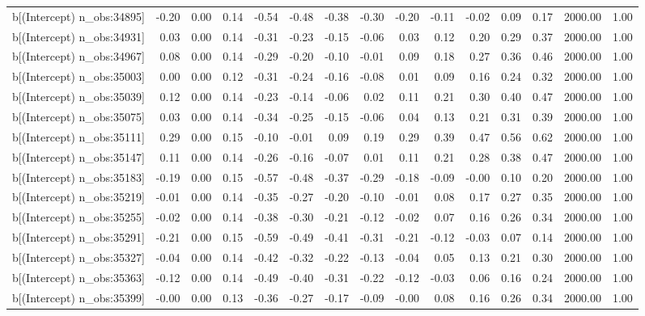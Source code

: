 \begin{table}[ht]
\begin{tabular}{rrrrrrrrrrrrrrr}
  b[(Intercept) n\_obs:34895] & -0.20 & 0.00 & 0.14 & -0.54 & -0.48 & -0.38 & -0.30 & -0.20 & -0.11 & -0.02 & 0.09 & 0.17 & 2000.00 & 1.00 \\ 
  b[(Intercept) n\_obs:34931] & 0.03 & 0.00 & 0.14 & -0.31 & -0.23 & -0.15 & -0.06 & 0.03 & 0.12 & 0.20 & 0.29 & 0.37 & 2000.00 & 1.00 \\ 
  b[(Intercept) n\_obs:34967] & 0.08 & 0.00 & 0.14 & -0.29 & -0.20 & -0.10 & -0.01 & 0.09 & 0.18 & 0.27 & 0.36 & 0.46 & 2000.00 & 1.00 \\ 
  b[(Intercept) n\_obs:35003] & 0.00 & 0.00 & 0.12 & -0.31 & -0.24 & -0.16 & -0.08 & 0.01 & 0.09 & 0.16 & 0.24 & 0.32 & 2000.00 & 1.00 \\ 
  b[(Intercept) n\_obs:35039] & 0.12 & 0.00 & 0.14 & -0.23 & -0.14 & -0.06 & 0.02 & 0.11 & 0.21 & 0.30 & 0.40 & 0.47 & 2000.00 & 1.00 \\ 
  b[(Intercept) n\_obs:35075] & 0.03 & 0.00 & 0.14 & -0.34 & -0.25 & -0.15 & -0.06 & 0.04 & 0.13 & 0.21 & 0.31 & 0.39 & 2000.00 & 1.00 \\ 
  b[(Intercept) n\_obs:35111] & 0.29 & 0.00 & 0.15 & -0.10 & -0.01 & 0.09 & 0.19 & 0.29 & 0.39 & 0.47 & 0.56 & 0.62 & 2000.00 & 1.00 \\ 
  b[(Intercept) n\_obs:35147] & 0.11 & 0.00 & 0.14 & -0.26 & -0.16 & -0.07 & 0.01 & 0.11 & 0.21 & 0.28 & 0.38 & 0.47 & 2000.00 & 1.00 \\ 
  b[(Intercept) n\_obs:35183] & -0.19 & 0.00 & 0.15 & -0.57 & -0.48 & -0.37 & -0.29 & -0.18 & -0.09 & -0.00 & 0.10 & 0.20 & 2000.00 & 1.00 \\ 
  b[(Intercept) n\_obs:35219] & -0.01 & 0.00 & 0.14 & -0.35 & -0.27 & -0.20 & -0.10 & -0.01 & 0.08 & 0.17 & 0.27 & 0.35 & 2000.00 & 1.00 \\ 
  b[(Intercept) n\_obs:35255] & -0.02 & 0.00 & 0.14 & -0.38 & -0.30 & -0.21 & -0.12 & -0.02 & 0.07 & 0.16 & 0.26 & 0.34 & 2000.00 & 1.00 \\ 
  b[(Intercept) n\_obs:35291] & -0.21 & 0.00 & 0.15 & -0.59 & -0.49 & -0.41 & -0.31 & -0.21 & -0.12 & -0.03 & 0.07 & 0.14 & 2000.00 & 1.00 \\ 
  b[(Intercept) n\_obs:35327] & -0.04 & 0.00 & 0.14 & -0.42 & -0.32 & -0.22 & -0.13 & -0.04 & 0.05 & 0.13 & 0.21 & 0.30 & 2000.00 & 1.00 \\ 
  b[(Intercept) n\_obs:35363] & -0.12 & 0.00 & 0.14 & -0.49 & -0.40 & -0.31 & -0.22 & -0.12 & -0.03 & 0.06 & 0.16 & 0.24 & 2000.00 & 1.00 \\ 
  b[(Intercept) n\_obs:35399] & -0.00 & 0.00 & 0.13 & -0.36 & -0.27 & -0.17 & -0.09 & -0.00 & 0.08 & 0.16 & 0.26 & 0.34 & 2000.00 & 1.00 \\ 

\end{tabular}
\end{table}
